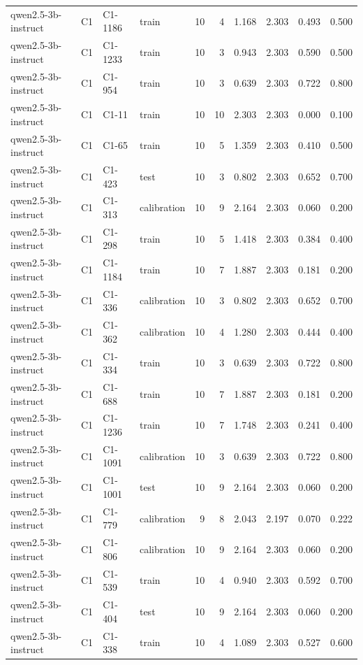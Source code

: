 \begin{table}
\begin{tabular}{llllrrrrrr}
qwen2.5-3b-instruct & C1 & C1-1186 & train & 10 & 4 & 1.168 & 2.303 & 0.493 & 0.500 \\
qwen2.5-3b-instruct & C1 & C1-1233 & train & 10 & 3 & 0.943 & 2.303 & 0.590 & 0.500 \\
qwen2.5-3b-instruct & C1 & C1-954 & train & 10 & 3 & 0.639 & 2.303 & 0.722 & 0.800 \\
qwen2.5-3b-instruct & C1 & C1-11 & train & 10 & 10 & 2.303 & 2.303 & 0.000 & 0.100 \\
qwen2.5-3b-instruct & C1 & C1-65 & train & 10 & 5 & 1.359 & 2.303 & 0.410 & 0.500 \\
qwen2.5-3b-instruct & C1 & C1-423 & test & 10 & 3 & 0.802 & 2.303 & 0.652 & 0.700 \\
qwen2.5-3b-instruct & C1 & C1-313 & calibration & 10 & 9 & 2.164 & 2.303 & 0.060 & 0.200 \\
qwen2.5-3b-instruct & C1 & C1-298 & train & 10 & 5 & 1.418 & 2.303 & 0.384 & 0.400 \\
qwen2.5-3b-instruct & C1 & C1-1184 & train & 10 & 7 & 1.887 & 2.303 & 0.181 & 0.200 \\
qwen2.5-3b-instruct & C1 & C1-336 & calibration & 10 & 3 & 0.802 & 2.303 & 0.652 & 0.700 \\
qwen2.5-3b-instruct & C1 & C1-362 & calibration & 10 & 4 & 1.280 & 2.303 & 0.444 & 0.400 \\
qwen2.5-3b-instruct & C1 & C1-334 & train & 10 & 3 & 0.639 & 2.303 & 0.722 & 0.800 \\
qwen2.5-3b-instruct & C1 & C1-688 & train & 10 & 7 & 1.887 & 2.303 & 0.181 & 0.200 \\
qwen2.5-3b-instruct & C1 & C1-1236 & train & 10 & 7 & 1.748 & 2.303 & 0.241 & 0.400 \\
qwen2.5-3b-instruct & C1 & C1-1091 & calibration & 10 & 3 & 0.639 & 2.303 & 0.722 & 0.800 \\
qwen2.5-3b-instruct & C1 & C1-1001 & test & 10 & 9 & 2.164 & 2.303 & 0.060 & 0.200 \\
qwen2.5-3b-instruct & C1 & C1-779 & calibration & 9 & 8 & 2.043 & 2.197 & 0.070 & 0.222 \\
qwen2.5-3b-instruct & C1 & C1-806 & calibration & 10 & 9 & 2.164 & 2.303 & 0.060 & 0.200 \\
qwen2.5-3b-instruct & C1 & C1-539 & train & 10 & 4 & 0.940 & 2.303 & 0.592 & 0.700 \\
qwen2.5-3b-instruct & C1 & C1-404 & test & 10 & 9 & 2.164 & 2.303 & 0.060 & 0.200 \\
qwen2.5-3b-instruct & C1 & C1-338 & train & 10 & 4 & 1.089 & 2.303 & 0.527 & 0.600 \\

\end{tabular}
\end{table}
